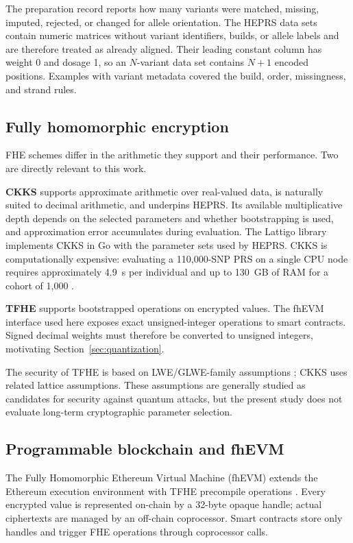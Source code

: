 \documentclass[10pt]{article}
\begin{document}
The preparation record reports how many variants were matched, missing, imputed,
rejected, or changed for allele orientation.  The HEPRS data sets contain
numeric matrices without variant identifiers, builds, or allele labels and are therefore
treated as already aligned.  Their leading constant column has weight 0 and dosage 1,
so an $N$-variant data set contains $N+1$ encoded positions.  Examples with variant
metadata covered the build, order, missingness, and strand rules.

\subsection{Fully homomorphic encryption}

FHE schemes differ in the arithmetic they support and their performance.  Two are
directly relevant to this work.

\textbf{CKKS} \citep{cheon2017ckks} supports approximate arithmetic over real-valued data, is
naturally suited to decimal arithmetic, and underpins HEPRS.  Its available
multiplicative depth depends on the selected parameters and whether bootstrapping is
used, and approximation error accumulates during evaluation.  The Lattigo library
\citep{lattigo} implements CKKS in Go with the parameter sets used
by HEPRS.  CKKS is computationally expensive: evaluating a 110,000-SNP PRS on a
single CPU node requires approximately 4.9~s per individual and up to 130~GB of RAM
for a cohort of 1,000 \citep{knight2026heprs}.

\textbf{TFHE} \citep{chillotti2020tfhe} supports bootstrapped operations on encrypted
values.  The fhEVM interface used here exposes exact unsigned-integer operations to
smart contracts.  Signed decimal weights must therefore be converted to unsigned
integers, motivating Section~\ref{sec:quantization}.

The security of TFHE is based on LWE/GLWE-family assumptions
\citep{chillotti2020tfhe}; CKKS uses related lattice assumptions.  These assumptions
are generally studied as candidates for security against quantum attacks, but the
present study does not evaluate long-term cryptographic parameter selection.

\subsection{Programmable blockchain and fhEVM}

The Fully Homomorphic Ethereum Virtual Machine (fhEVM) extends the Ethereum
execution environment with TFHE precompile operations \citep{zamafhevm}.  Every
encrypted value is represented on-chain by a 32-byte opaque handle; actual
ciphertexts are managed by an off-chain coprocessor.  Smart contracts store only
handles and trigger FHE operations through coprocessor calls.
\end{document}
